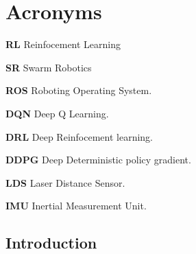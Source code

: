 \documentclass[12pt]{extarticle}
\begin{document}
\newpage
\thispagestyle{empty}
{
\hypersetup{linkcolor=false}
\tableofcontents

}



\newpage
\thispagestyle{empty}
{
\hypersetup{linkcolor=false}
\tableofcontents

}
\newpage
\listoffigures
\clearpage

\newpage
\section*{Acronyms}

\hspace{0.5cm} \textbf{RL}  Reinfocement Learning

\vspace{0.2cm}

\textbf{SR} Swarm Robotics

\vspace{0.2cm}
\textbf{ROS} Roboting Operating System.

\vspace{0.2cm}

\textbf{DQN} Deep Q Learning.

\vspace{0.2cm}

\textbf{DRL} Deep Reinfocement learning.

\vspace{0.2cm}



\textbf{DDPG} Deep Deterministic policy gradient.

\vspace{0.2cm}

\textbf{LDS} Laser Distance Sensor.

\vspace{0.2cm}

\textbf{IMU} Inertial Measurement Unit.

\vspace{0.2cm}



  








\newpage
\pagebreak
\hspace{0pt}
\vfill
\begin{center}
\section{Introduction}
\end{center}
\vfill
\hspace{0pt}
\pagebreak
\end{document}
